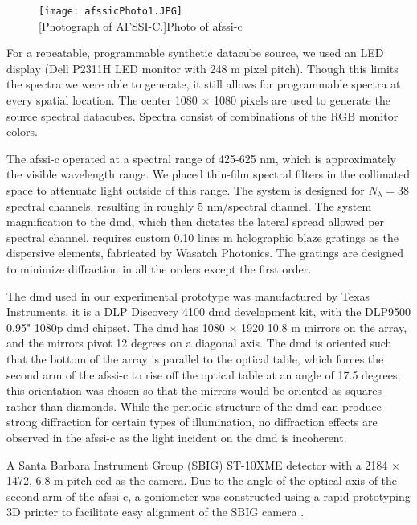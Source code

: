 \begin{figure}[htb]
	\centering
	\texttt{[image: afssicPhoto1.JPG]}\\
	[Photograph of AFSSI-C.]{Photo of \gls{afssi-c}}
	\label{fig:afssicPhoto1}
\end{figure}

For a repeatable, programmable synthetic datacube source, we used an LED display (Dell P2311H LED monitor with 248 \textmu m pixel pitch). Though this limits the spectra we were able to generate, it still allows for programmable spectra at every spatial location. The center 1080 $\times$ 1080 pixels are used to generate the source spectral datacubes. Spectra consist of combinations of the RGB monitor colors.

The \gls{afssi-c} operated at a spectral range of 425-625 nm, which is approximately the visible wavelength range. We placed thin-film spectral filters in the collimated space to attenuate light outside of this range. The system is designed for $N_{\lambda} = 38$ spectral channels, resulting in roughly $5$ nm/spectral channel. The system magnification to the \gls{dmd}, which then dictates the lateral spread allowed per spectral channel, requires custom 0.10 lines \textmu m holographic blaze gratings as the dispersive elements, fabricated by Wasatch Photonics. The gratings are designed to minimize diffraction in all the orders except the first order. 

The \gls{dmd} used in our experimental prototype was manufactured by Texas Instruments, it is a DLP Discovery 4100 \gls{dmd} development kit, with the DLP9500 0.95" 1080p \gls{dmd} chipset. The \gls{dmd} has 1080 $\times$ 1920 10.8 \textmu m mirrors on the array, and the mirrors pivot 12 degrees on a diagonal axis. The \gls{dmd} is oriented such that the bottom of the array is parallel to the optical table, which forces the second arm of the \gls{afssi-c} to rise off the optical table at an angle of 17.5 degrees; this orientation was chosen so that the mirrors would be oriented as squares rather than diamonds. While the periodic structure of the \gls{dmd} can produce strong diffraction for certain types of illumination, no diffraction effects are observed in the \gls{afssi-c} as the light incident on the \gls{dmd} is incoherent. 

A Santa Barbara Instrument Group (SBIG) ST-10XME detector with a 2184 $\times$ 1472, 6.8  \textmu m pitch \gls{ccd} as the camera. Due to the angle of the optical axis of the second arm of the \gls{afssi-c}, a goniometer was constructed using a rapid prototyping 3D printer to facilitate easy alignment of the SBIG camera \cite{dunlop-gray2015phdthesis}.

